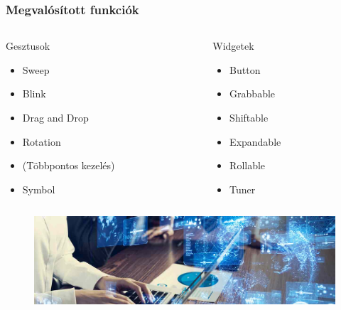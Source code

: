 \documentclass{beamer}
\begin{document}
\begin{frame}[fragile]
\frametitle{Megvalósított funkciók}

\begin{columns}
	\begin{column}{4.5cm}
		\begin{block}{Gesztusok}
		\begin{itemize}
			\item Sweep
			\item Blink
			\item Drag and Drop
			\item Rotation
			\item (Többpontos kezelés)
			\item Symbol
		\end{itemize}
		\end{block}
	\end{column}
	
	\begin{column}{4.5cm}
		\begin{block}{Widgetek}
		\begin{itemize}
			\item Button
			\item Grabbable
			\item Shiftable
			\item Expandable
			\item Rollable
			\item Tuner
		\end{itemize}
		\end{block}
	\end{column}
\end{columns}

\begin{figure}[htb]
	\includegraphics[width=\textwidth]{images/laptop.png}
\end{figure}

\end{frame}
\end{document}
